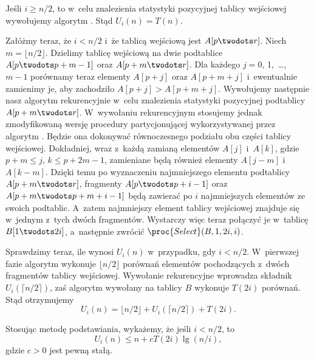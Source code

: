 \subproblem %

\noindent Jeśli $i\ge n/2$, to w~celu znalezienia  statystyki pozycyjnej tablicy wejściowej wywołujemy algorytm .
Stąd $U_i(n)=T(n)$.

Załóżmy teraz, że $i<n/2$ i~że tablicą wejściową jest $A[p\twodots r]$.
Niech $m=\lfloor n/2\rfloor$.
Dzielimy tablicę wejściową na dwie podtablice $A[p\twodots p+m-1]$ oraz $A[p+m\twodots r]$.
Dla każdego $j=0$, 1,~\dots,~$m-1$ porównamy teraz elementy $A[p+j]$ oraz $A[p+m+j]$ i~ewentualnie zamienimy je, aby zachodziło $A[p+j]>A[p+m+j]$.
Wywołujemy następnie nasz algorytm rekurencyjnie w~celu znalezienia  statystyki pozycyjnej podtablicy $A[p+m\twodots r]$.
W~wywołaniu rekurencyjnym stosujemy jednak zmodyfikowaną wersję procedury partycjonującej wykorzystywanej przez algorytm .
Będzie ona dokonywać równoczesnego podziału obu części tablicy wejściowej.
Dokładniej, wraz z~każdą zamianą elementów $A[j]$ i~$A[k]$, gdzie $p+m\le j$, $k\le p+2m-1$, zamieniane będą również elementy $A[j-m]$ i~$A[k-m]$.
Dzięki temu po wyznaczeniu  najmniejszego elementu podtablicy $A[p+m\twodots r]$, fragmenty $A[p\twodots p+i-1]$ oraz $A[p+m\twodots p+m+i-1]$ będą zawierać po $i$ najmniejszych elementów ze swoich podtablic.
A~zatem  najmniejszy element tablicy wejściowej znajduje się w~jednym z~tych dwóch fragmentów.
Wystarczy więc teraz połączyć je w~tablicę $B[1\twodots2i]$, a~następnie zwrócić $\proc{Select}(B,1,2i,i)$.

Sprawdzimy teraz, ile wynosi $U_i(n)$ w~przypadku, gdy $i<n/2$.
W~pierwszej fazie algorytm wykonuje $\lfloor n/2\rfloor$ porównań elementów pochodzących z~dwóch fragmentów tablicy wejściowej.
Wywołanie rekurencyjne wprowadza składnik $U_i(\lceil n/2\rceil)$, zaś algorytm  wywołany na tablicy $B$ wykonuje $T(2i)$ porównań.
Stąd otrzymujemy
\[
    U_i(n) = \lfloor n/2\rfloor+U_i(\lceil n/2\rceil)+T(2i).
\]

\subproblem %
Stosując metodę podstawiania, wykażemy, że jeśli $i<n/2$, to
\[
	U_i(n) \le n+cT(2i)\lg(n/i),
\]
gdzie $c>0$ jest pewną stałą.

